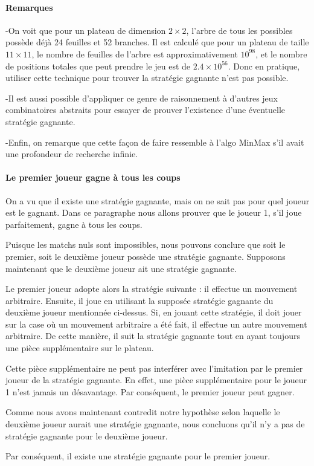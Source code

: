 \paragraph {Remarques}
-On voit que pour un plateau de dimension $2\times2$, l'arbre de tous les possibles possède déjà 24 feuilles et 52 branches.
Il est calculé que pour un plateau de taille $11\times11$, le nombre de feuilles de l'arbre est
approximativement $10^{98}$, et le nombre de positions totales que peut prendre le jeu est de $2.4\times10^{56}$.
Donc en pratique, utiliser cette technique pour trouver la stratégie gagnante n'est pas possible.

-Il est aussi possible d'appliquer ce genre de raisonnement à d'autres jeux combinatoires abstraits pour essayer de
prouver l'existence d'une éventuelle stratégie gagnante.

-Enfin, on remarque que cette façon de faire ressemble à l'algo MinMax s'il avait une profondeur de recherche
infinie.


\paragraph {Le premier joueur gagne à tous les coups}
On a vu que il existe une stratégie gagnante, mais on ne sait pas pour quel joueur est le gagnant. Dans ce paragraphe nous allons
prouver que le joueur 1, s'il joue parfaitement, gagne à tous les coups.

Puisque les matchs nuls sont impossibles, nous pouvons conclure que soit le premier, soit le deuxième joueur possède une stratégie
gagnante. Supposons maintenant que le deuxième joueur ait une stratégie gagnante.

Le premier joueur adopte alors la stratégie suivante : il effectue un mouvement arbitraire. Ensuite, 
il joue en utilisant la supposée stratégie gagnante du deuxième joueur mentionnée ci-dessus. Si,
en jouant cette stratégie, il doit jouer sur la case où un mouvement arbitraire a été fait, il effectue
un autre mouvement arbitraire. De cette manière, il suit la stratégie gagnante tout en ayant toujours une pièce
supplémentaire sur le plateau.

Cette pièce supplémentaire ne peut pas interférer avec l'imitation par le premier joueur de la stratégie gagnante.
En effet, une pièce supplémentaire pour le joueur 1 n'est jamais un désavantage. Par conséquent, le premier joueur peut
gagner.

Comme nous avons maintenant contredit notre hypothèse selon laquelle le deuxième joueur aurait une stratégie gagnante,
nous concluons qu'il n'y a pas de stratégie gagnante pour le deuxième joueur.

Par conséquent, il existe une stratégie gagnante pour le premier joueur.